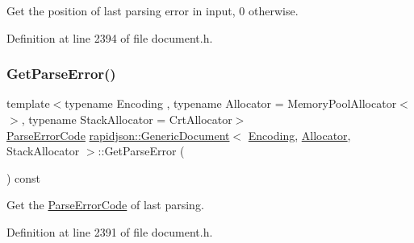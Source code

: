Get the position of last parsing error in input, 0 otherwise. 



Definition at line 2394 of file document.\+h.


\begin{DoxyCode}{0}

\end{DoxyCode}
\mbox{\label{classrapidjson_1_1_generic_document_ab94c280c079a6837a24951cb4d8f337b}} 
\subsubsection{\texorpdfstring{GetParseError()}{GetParseError()}}
{\footnotesize\ttfamily template$<$typename Encoding , typename Allocator  = Memory\+Pool\+Allocator$<$$>$, typename Stack\+Allocator  = Crt\+Allocator$>$ \\
\mbox{\hyperlink{group___r_a_p_i_d_j_s_o_n___e_r_r_o_r_s_ga7d3acf640886b1f2552dc8c4cd6dea60}{Parse\+Error\+Code}} \mbox{\hyperlink{classrapidjson_1_1_generic_document}{rapidjson\+::\+Generic\+Document}}$<$ \mbox{\hyperlink{classrapidjson_1_1_encoding}{Encoding}}, \mbox{\hyperlink{classrapidjson_1_1_allocator}{Allocator}}, Stack\+Allocator $>$\+::Get\+Parse\+Error (\begin{DoxyParamCaption}{ }\end{DoxyParamCaption}) const}



Get the \mbox{\hyperlink{group___r_a_p_i_d_j_s_o_n___e_r_r_o_r_s_ga7d3acf640886b1f2552dc8c4cd6dea60}{Parse\+Error\+Code}} of last parsing. 



Definition at line 2391 of file document.\+h.


